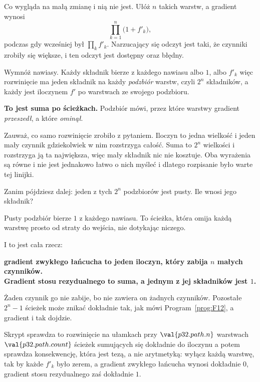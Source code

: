\begin{fr}

Co wygląda na małą zmianę i nią nie jest. Ułóż $n$ takich warstw, a gradient
wynosi
\[ \prod_{k=1}^{n} \bigl(1 + f'_k\bigr), \]
podczas gdy wcześniej był $\prod_k f'_k$. Narzucający się odczyt jest taki, że
czynniki zrobiły się większe, i ten odczyt jest dostępny oraz błędny.

Wymnóż nawiasy. Każdy składnik bierze z każdego nawiasu albo $1$, albo
$f'_k$ \dash{} więc rozwinięcie ma jeden składnik na każdy \emph{podzbiór}
warstw, czyli $2^{n}$ składników, a każdy jest iloczynem $f'$ po warstwach ze
swojego podzbioru.

\textbf{To jest suma po ścieżkach.} Podzbiór mówi, przez które warstwy
gradient \emph{przeszedł}, a które \emph{ominął}.

Zauważ, co samo rozwinięcie zrobiło z pytaniem. Iloczyn to jedna wielkość i
jeden mały czynnik gdziekolwiek w nim rozstrzyga całość. Suma to $2^{n}$
wielkości i rozstrzyga ją ta największa, więc mały składnik nic nie kosztuje.
Oba wyrażenia są równe i nie jest jednakowo łatwo o nich myśleć \dash{} i
dlatego rozpisanie było warte tej linijki.

Zanim pójdziesz dalej: jeden z tych $2^{n}$ podzbiorów jest pusty. Ile wnosi
jego składnik?
\dotline
\nextframe
\end{fr}

\begin{fr}

Pusty podzbiór bierze $1$ z każdego nawiasu. To ścieżka, która omija każdą
warstwę \dash{} prosto od straty do wejścia, nie dotykając niczego.

I to jest cała rzecz:

\begin{center}
\textbf{gradient zwykłego łańcucha to jeden iloczyn, który zabija $n$ małych
czynników.\\
Gradient stosu rezydualnego to suma, a jednym z jej składników jest $1$.}
\end{center}

Żaden czynnik go nie zabije, bo nie zawiera on żadnych czynników. Pozostałe
$2^{n} - 1$ ścieżek może znikać dokładnie tak, jak mówi
Program~\ref{prog:F12}, a gradient i tak dojdzie.

Skrypt sprawdza to rozwinięcie na ułamkach przy $\val{p32.path.n}$ warstwach
\dash{} $\val{p32.path.count}$ ścieżek sumujących się dokładnie do iloczynu
\dash{} a potem sprawdza konsekwencję, która jest tezą, a nie arytmetyką:
wyłącz każdą warstwę, tak by każde $f'_k$ było zerem, a gradient zwykłego
łańcucha wynosi dokładnie $0$, gradient stosu rezydualnego zaś dokładnie $1$.
\end{fr}

